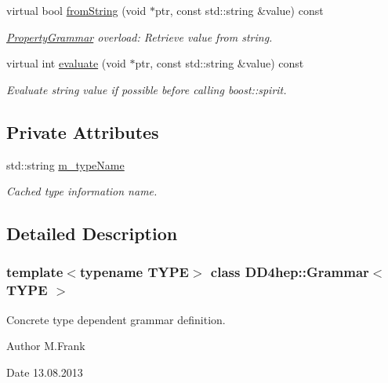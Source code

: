 \begin{DoxyCompactItemize}
virtual bool \hyperlink{class_d_d4hep_1_1_grammar_a275a87cbf97f851be158441d373ae2b2}{fromString} (void $\ast$ptr, const std::string \&value) const 
\begin{DoxyCompactList}\small\item\em \hyperlink{class_d_d4hep_1_1_property_grammar}{PropertyGrammar} overload: Retrieve value from string. \item\end{DoxyCompactList}\item 
virtual int \hyperlink{class_d_d4hep_1_1_grammar_a794aaf9d5b05a13ad4d62870cba5865e}{evaluate} (void $\ast$ptr, const std::string \&value) const 
\begin{DoxyCompactList}\small\item\em Evaluate string value if possible before calling boost::spirit. \item\end{DoxyCompactList}\end{DoxyCompactItemize}
\subsection*{Private Attributes}
\begin{DoxyCompactItemize}
\item 
std::string \hyperlink{class_d_d4hep_1_1_grammar_a10842e3b2f4549f2f8f2b0306e17a43d}{m\_\-typeName}
\begin{DoxyCompactList}\small\item\em Cached type information name. \item\end{DoxyCompactList}\end{DoxyCompactItemize}


\subsection{Detailed Description}
\subsubsection*{template$<$typename TYPE$>$ class DD4hep::Grammar$<$ TYPE $>$}

Concrete type dependent grammar definition. \begin{DoxyAuthor}{Author}
M.Frank 
\end{DoxyAuthor}
\begin{DoxyDate}{Date}
13.08.2013 
\end{DoxyDate}



